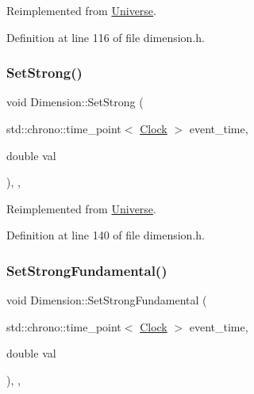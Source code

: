 Reimplemented from \hyperlink{class_universe_ae2ae1c3b3e4cde2c18f5f6a814761ec8}{Universe}.



Definition at line 116 of file dimension.\+h.

\mbox{\label{class_dimension_ab9021cb6727ed590026bf870c638576d}} 
\subsubsection{\texorpdfstring{Set\+Strong()}{SetStrong()}}
{\footnotesize\ttfamily void Dimension\+::\+Set\+Strong (\begin{DoxyParamCaption}\item[{std\+::chrono\+::time\+\_\+point$<$ \hyperlink{universe_8h_a0ef8d951d1ca5ab3cfaf7ab4c7a6fd80}{Clock} $>$}]{event\+\_\+time,  }\item[{double}]{val }\end{DoxyParamCaption})\hspace{0.3cm}{\ttfamily [inline]}, {\ttfamily [final]}, {\ttfamily [virtual]}}



Reimplemented from \hyperlink{class_universe_a5946c8f3d4cda305f3ecd10df21a2f94}{Universe}.



Definition at line 140 of file dimension.\+h.

\mbox{\label{class_dimension_a2de864aaa4b1074684395dbe928468c1}} 
\subsubsection{\texorpdfstring{Set\+Strong\+Fundamental()}{SetStrongFundamental()}}
{\footnotesize\ttfamily void Dimension\+::\+Set\+Strong\+Fundamental (\begin{DoxyParamCaption}\item[{std\+::chrono\+::time\+\_\+point$<$ \hyperlink{universe_8h_a0ef8d951d1ca5ab3cfaf7ab4c7a6fd80}{Clock} $>$}]{event\+\_\+time,  }\item[{double}]{val }\end{DoxyParamCaption})\hspace{0.3cm}{\ttfamily [inline]}, {\ttfamily [final]}, {\ttfamily [virtual]}}



